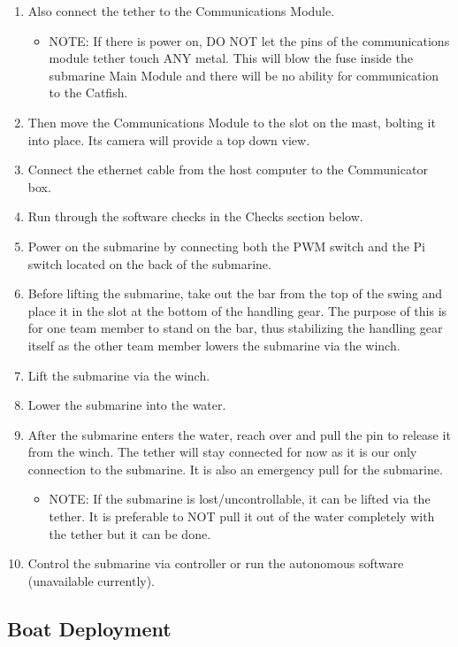 \documentclass[
18pt, %
a4paper, %
oneside, %
headinclude,footinclude, %
]{scrartcl}
\begin{document}
\begin{enumerate}
	\item Also connect the tether to the Communications Module. 
		\begin{itemize}
				\item NOTE: If there is power on, DO NOT let the pins of the communications module tether touch ANY metal. This will blow the fuse inside the submarine Main Module and there will be no ability for communication to the Catfish.
		\end{itemize}
	\item Then move the Communications Module to the slot on the mast, bolting it into place. Its camera will provide a top down view.
	\item Connect the ethernet cable from the host computer to the Communicator box. 
	\item Run through the software checks in the Checks section below.
	\item Power on the submarine by connecting both the PWM switch and the Pi switch located on the back of the submarine.		
	\item Before lifting the submarine, take out the bar from the top of the swing and place it in the slot at the bottom of the handling gear. The purpose of this is for one team member to stand on the bar, thus stabilizing the handling gear itself as the other team member lowers the submarine via the winch.
	\item Lift the submarine via the winch. 
	\item Lower the submarine into the water.
	\item After the submarine enters the water, reach over and pull the pin to release it from the winch. The tether will stay connected for now as it is our only connection to the submarine. It is also an emergency pull for the submarine.
		\begin{itemize}
				\item NOTE: If the submarine is lost/uncontrollable, it can be lifted via the tether. It is preferable to NOT pull it out of the water completely with the tether but it can be done.	
		\end{itemize}
	\item Control the submarine via controller or run the autonomous software (unavailable currently). 
\end{enumerate}


\subsection{Boat Deployment}
\end{document}
